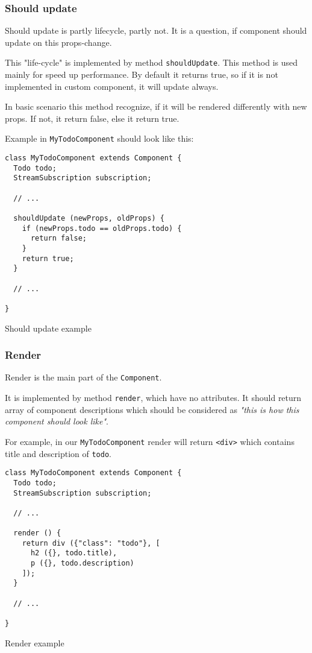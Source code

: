       
    \subsubsection{Should update}\label{subsec:our-architecture-lifecycle-shouldupdate}
      Should update is partly lifecycle, partly not. 
      It is a question, if component should update on  this props-change. 

      This "life-cycle" is implemented by method \texttt{shouldUpdate}. 
      This method is used mainly for speed up performance. 
      By default it returns true, 
      so if it is not implemented in custom component, 
      it will update always.

      In basic scenario this method recognize, 
      if it will be rendered differently with new props.  
      If not, it return false, else it return true.

      Example in \texttt{MyTodoComponent} should look like this:
      \begin{listing}
        \begin{verbatim}
class MyTodoComponent extends Component {
  Todo todo;
  StreamSubscription subscription;

  // ...

  shouldUpdate (newProps, oldProps) {
    if (newProps.todo == oldProps.todo) {
      return false;
    }
    return true;
  }

  // ...

}
        \end{verbatim}
        \caption{Should update example}
        \label{subsec:our-architecture-lifecycle-shouldupdate-example}
      \end{listing}

    \subsubsection{Render}\label{subsec:our-architecture-lifecycle-render}

      Render is the main part of the \texttt{Component}. 

      It is implemented by method \texttt{render}, which have no attributes.
      It should return array of component descriptions which should be considered as 
      \textit{"this is how this component should look like"}.

      For example, in our \texttt{MyTodoComponent} render will return \texttt{<div>} which contains title and description of \texttt{todo}.
      \begin{listing}
        \begin{verbatim}
class MyTodoComponent extends Component {
  Todo todo;
  StreamSubscription subscription;

  // ...

  render () {
    return div ({"class": "todo"}, [
      h2 ({}, todo.title),
      p ({}, todo.description)
    ]);
  }

  // ...

}
        \end{verbatim}
        \caption{Render example}
        \label{subsec:our-architecture-lifecycle-render-example}
      \end{listing}

